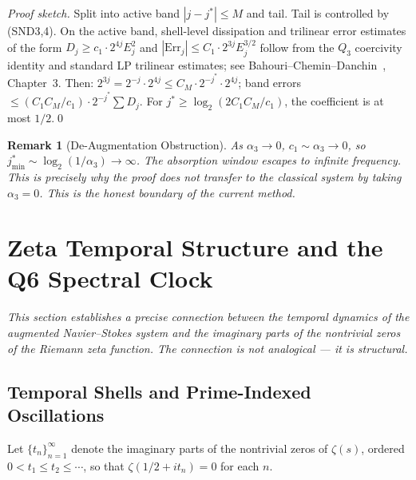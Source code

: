 \documentclass[11pt]{article}
\newtheorem{remark}[theorem]{Remark}
\begin{document}
\begin{proof}[Proof sketch]
Split into active band $|j-j^*|\leq M$ and tail.
Tail is controlled by (SND3,4). On the active band, shell-level dissipation and trilinear
error estimates of the form $D_j \geq c_1\cdot 2^{4j} E_j^2$ and
$|\mathrm{Err}_j| \leq C_1\cdot 2^{3j} E_j^{3/2}$ follow from the $Q_3$ coercivity
identity and standard LP trilinear estimates; see Bahouri--Chemin--Danchin~\cite{BCD2011},
Chapter~3. Then: $2^{3j} = 2^{-j}\cdot 2^{4j} \leq C_M\cdot 2^{-j^*}\cdot 2^{4j}$;
band errors $\leq (C_1 C_M/c_1)\cdot 2^{-j^*}\sum D_j$.
For $j^*\geq\log_2(2C_1 C_M/c_1)$, the coefficient is at most $1/2$.\qed
\end{proof}

\begin{remark}[De-Augmentation Obstruction]
As $\alpha_3\to 0$, $c_1\sim\alpha_3\to 0$, so $j^*_{\min}\sim\log_2(1/\alpha_3)\to\infty$.
The absorption window escapes to infinite frequency. \textit{This is precisely why the proof
does not transfer to the classical system by taking $\alpha_3=0$.} This is the honest boundary
of the current method.
\end{remark}

\section{Zeta Temporal Structure and the Q6 Spectral Clock}
\label{sec:temporal}

\textit{This section establishes a precise connection between the temporal
dynamics of the augmented Navier--Stokes system and the imaginary parts of
the nontrivial zeros of the Riemann zeta function.
The connection is not analogical --- it is structural.}

\subsection{Temporal Shells and Prime-Indexed Oscillations}

Let $\{t_n\}_{n=1}^\infty$ denote the imaginary parts of the nontrivial
zeros of $\zeta(s)$, ordered $0 < t_1 \leq t_2 \leq \cdots$, so that
$\zeta(1/2 + it_n) = 0$ for each $n$.
\end{document}
